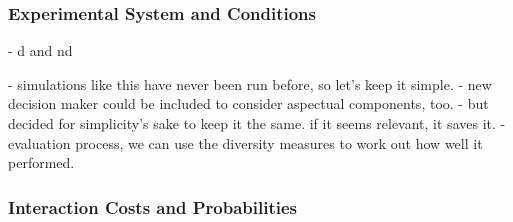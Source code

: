 \subsubsection{Experimental System and Conditions}

- d and nd

- simulations like this have never been run before, so let's keep it simple.
- new decision maker could be included to consider aspectual components, too.
- but decided for simplicity's sake to keep it the same. if it seems relevant, it saves it.
- evaluation process, we can use the diversity measures to work out how well it performed.



\subsubsection{Interaction Costs and Probabilities}

